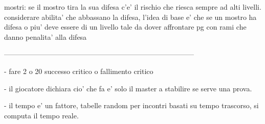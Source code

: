 \documentclass[12pt,a4paper,twoside,openany,twocolumn]{book}
\begin{document}
mostri:
se il mostro tira la sua difesa c'e' il rischio che riesca sempre ad alti livelli. considerare abilita' che abbassano la difesa, l'idea di base e' che se un mostro ha difesa  o piu' deve essere di un livello tale da dover affrontare pg con rami che danno penalita' alla difesa


--------------------------------------------------------------------------------



- fare 2 o 20  successo critico o fallimento  critico

- il giocatore dichiara cio' che fa e' solo il master a stabilire se serve una prova. 

- il tempo e' un fattore, tabelle random per incontri basati su tempo trascorso, si computa il tempo reale.
\end{document}
